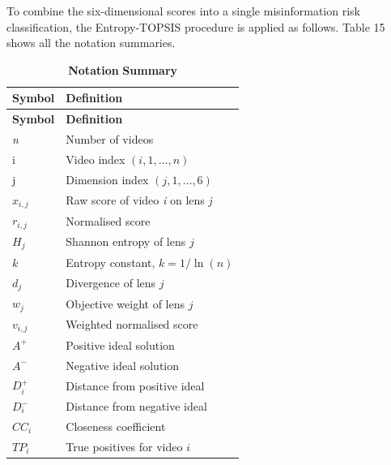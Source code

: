 \documentclass[]{article}
\begin{document}
To combine the six-dimensional scores into a single misinformation risk classification, the Entropy-TOPSIS procedure is applied as follows. Table 15 shows all the notation summaries.

\begin{longtable}[]{@{}
  >{\raggedright\arraybackslash}p{}
  >{\raggedright\arraybackslash}p{}@{}}
\caption{\textbf{Notation} \textbf{Summary}}\tabularnewline
\toprule\noalign{}
\begin{minipage}[b]{\linewidth}\raggedright
\textbf{Symbol}
\end{minipage} & \begin{minipage}[b]{\linewidth}\raggedright
\textbf{Definition}
\end{minipage} \\
\midrule\noalign{}
\endfirsthead
\toprule\noalign{}
\begin{minipage}[b]{\linewidth}\raggedright
\textbf{Symbol}
\end{minipage} & \begin{minipage}[b]{\linewidth}\raggedright
\textbf{Definition}
\end{minipage} \\
\midrule\noalign{}
\endhead
\bottomrule\noalign{}
\endlastfoot
\emph{n} & Number of videos \\
i & Video index \((i,1,\ldots,n)\) \\
j & Dimension index \((j,1,\ldots,6)\) \\
\(x_{i,j}\) & Raw score of video \emph{i} on lens \emph{j} \\
\(r_{i,j}\) & Normalised score \\
\(H_{j}\) & Shannon entropy of lens \(j\) \\
\(k\) & Entropy constant, \(k = 1/\ln(n)\) \\
\(d_{j}\) & Divergence of lens \(j\) \\
\(w_{j}\) & Objective weight of lens \(j\) \\
\(v_{i,j}\) & Weighted normalised score \\
\(A^{+}\) & Positive ideal solution \\
\(A^{-}\) & Negative ideal solution \\
\(D_{i}^{+}\) & Distance from positive ideal \\
\(D_{i}^{-}\) & Distance from negative ideal \\
\(CC_{i}\) & Closeness coefficient \\
\(TP_{i}\) & True positives for video \(i\) \\

\end{longtable}
\end{document}
